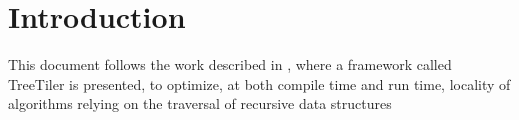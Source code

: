 \section{Introduction}
\label{sec:intro}

This document follows the work described in \cite{tree_tiler}, where a framework called TreeTiler is presented, to optimize, at both compile time and run time, locality of algorithms relying on the traversal of recursive data structures

